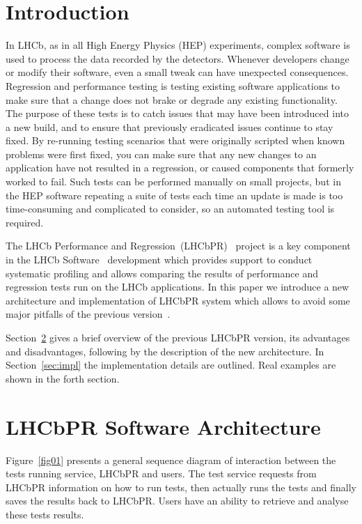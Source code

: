 \documentclass[a4paper]{jpconf}
\begin{document}
\section{Introduction}

In LHCb, as in all High Energy Physics (HEP) experiments, complex software is
used to process the data recorded by the detectors. Whenever developers change
or modify their software, even a small tweak can have unexpected
consequences. Regression and performance testing is testing existing software
applications to make sure that a change does not brake or degrade any existing
functionality. The purpose of these tests is to catch issues that may have been
introduced into a new build, and to ensure that previously eradicated issues
continue to stay fixed. By re-running testing scenarios that were originally
scripted when known problems were first fixed, you can make sure that any new
changes to an application have not resulted in a regression, or caused components
that formerly worked to fail. Such tests can be performed manually on small
projects, but in the HEP software repeating a suite of tests each time an update
is made is too time-consuming and complicated to consider, so an automated
testing tool is required. 

The LHCb Performance and Regression~(LHCbPR)~\cite{lhcbpr}  project is a key
component in the LHCb Software~\cite{lhcbsoft} development which provides
support to conduct systematic profiling and allows comparing the results of
performance and regression tests run on the LHCb applications. In this paper we
introduce a new architecture and implementation of LHCbPR system which allows to
avoid some major pitfalls of the previous version~\cite{lhcbpr}.

Section~\ref{sec:arch} gives a brief overview of the previous LHCbPR version,
its advantages and disadvantages, following by the description of the
new architecture. In Section~\ref{sec:impl} the implementation details are outlined.
Real examples are shown in the forth section.

\section{LHCbPR Software Architecture}\label{sec:arch}

Figure~\ref{fig01} presents a general sequence diagram of interaction between
the tests running service, LHCbPR  and users. The test service requests from
LHCbPR information on how to run tests, then actually runs the tests and finally
saves the results back to LHCbPR. Users have an ability to retrieve and analyse
these tests results.
\end{document}

